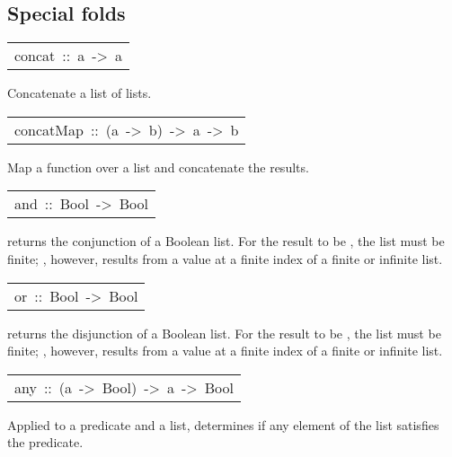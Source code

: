 \subsection{Special folds
}
\begin{haddockdesc}
\item[\begin{tabular}{@{}l}
concat\ ::\ {\char 91}{\char 91}a{\char 93}{\char 93}\ ->\ {\char 91}a{\char 93}
\end{tabular}]\haddockbegindoc
Concatenate a list of lists.
\par

\end{haddockdesc}
\begin{haddockdesc}
\item[\begin{tabular}{@{}l}
concatMap\ ::\ (a\ ->\ {\char 91}b{\char 93})\ ->\ {\char 91}a{\char 93}\ ->\ {\char 91}b{\char 93}
\end{tabular}]\haddockbegindoc
Map a function over a list and concatenate the results.
\par

\end{haddockdesc}
\begin{haddockdesc}
\item[\begin{tabular}{@{}l}
and\ ::\ {\char 91}Bool{\char 93}\ ->\ Bool
\end{tabular}]\haddockbegindoc
{} returns the conjunction of a Boolean list.  For the result to be
 , the list must be finite; , however, results from a 
 value at a finite index of a finite or infinite list.
\par

\end{haddockdesc}
\begin{haddockdesc}
\item[\begin{tabular}{@{}l}
or\ ::\ {\char 91}Bool{\char 93}\ ->\ Bool
\end{tabular}]\haddockbegindoc
{} returns the disjunction of a Boolean list.  For the result to be
 , the list must be finite; , however, results from a 
 value at a finite index of a finite or infinite list.
\par

\end{haddockdesc}
\begin{haddockdesc}
\item[\begin{tabular}{@{}l}
any\ ::\ (a\ ->\ Bool)\ ->\ {\char 91}a{\char 93}\ ->\ Bool
\end{tabular}]\haddockbegindoc
Applied to a predicate and a list,  determines if any element
 of the list satisfies the predicate.
\par

\end{haddockdesc}
